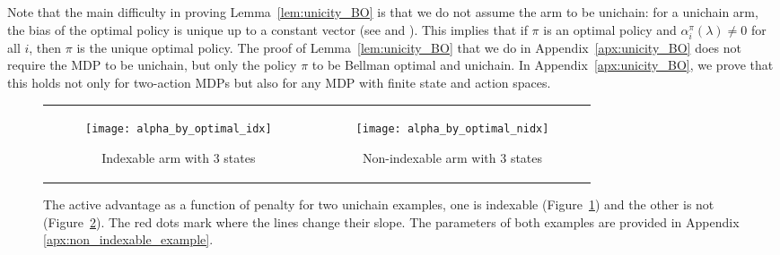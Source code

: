 Note that the main difficulty in proving Lemma~\ref{lem:unicity_BO} is that we do not assume the arm to be unichain: for a unichain arm, the bias of the optimal policy is unique up to a constant vector (see \cite{schweitzer1978functional} and \cite[Section 8.4]{puterman2014markov}).
This implies that if $\pi$ is an optimal policy and $\alpha^\pi_i(\lambda)\ne0$ for all $i$, then $\pi$ is the unique optimal policy.
The proof of Lemma~\ref{lem:unicity_BO} that we do in Appendix~\ref{apx:unicity_BO} does not require the MDP to be unichain, but only the policy $\pi$ to be Bellman optimal and unichain. In Appendix~\ref{apx:unicity_BO}, we prove that this holds not only for two-action MDPs but also for any MDP with finite state and action spaces.

\begin{figure}[ht]
    \begin{tabular}{cc}
        \begin{subfigure}[t]{0.48\linewidth}
            \texttt{[image: alpha\_by\_optimal\_idx]}
            \caption{Indexable arm with $3$ states}
            \label{fig:illustrate_vf}
        \end{subfigure}
        &\begin{subfigure}[t]{0.48\linewidth}
            \texttt{[image: alpha\_by\_optimal\_nidx]}
            \caption{Non-indexable arm with $3$ states}
            \label{fig:illustrate_non_indexable}
        \end{subfigure}            
    \end{tabular}
    \caption{
        The active advantage as a function of penalty for two unichain examples, one is indexable (Figure~\ref{fig:illustrate_vf}) and the other is not (Figure~\ref{fig:illustrate_non_indexable}).
        The red dots mark where the lines change their slope. The parameters of both examples are provided in Appendix \ref{apx:non_indexable_example}.
    }
    \label{fig:illustrate_indexability}
\end{figure}

